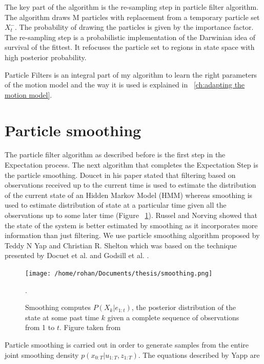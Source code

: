 \documentclass[12pt]{dalcsthesis}
\begin{document}
The key part of the algorithm is the re-sampling step in particle filter algorithm. The algorithm draws M particles with replacement from a temporary particle set $X_{t}^{-}$. The probability of drawing the particles is given by the importance factor. The re-sampling step is a probabilistic implementation of the Darwinian idea of survival of the fittest. It refocuses the particle set to regions in state space with high posterior probability. 

Particle Filters is an integral part of my algorithm to learn the right parameters of the motion model and the way it is used is explained in ~\ref{ch:adapting the motion model}.

\section{Particle smoothing}
\label{ch-: particle smoothing}
The particle filter algorithm as described before is the first step in the Expectation process. The next algorithm that completes the Expectation Step is the particle smoothing. Doucet \cite{doucet2009tutorial} in his paper stated that filtering based on observations received up to the current time is used to estimate the distribution of the current state of an Hidden Markov Model (HMM) whereas smoothing is used to estimate distribution of state at a particular time given all the observations up to some later time (Figure ~\ref{fig: particle smoothing}). Russel and Norving \cite{russell2003artificial} showed that the state of the system is better estimated by smoothing as it incorporates more information than just filtering. We use particle smoothing algorithm proposed by Teddy N Yap and Christian R. Shelton \cite{Yap2008} which was based on the technique presented by Docuet et al. \cite{doucet2000monte} and Godsill et al. \cite{Godsill2004}.
\begin{figure}
\centering
{\texttt{[image: /home/rohan/Documents/thesis/smoothing.png]}}

\caption{\label{fig: particle smoothing} Smoothing computes $P(X_{k}|e_{1:t})$, the posterior distribution of the state at some past time $k$ given a complete sequence of observations from 1 to $t$. Figure taken from \cite{russell2003artificial}}.
\end{figure}

Particle smoothing is carried out in order to generate samples from the entire joint smoothing density $p(x_{0:T}|u_{1:T},z_{1:T})$. 
The equations described by Yapp \cite{Yap2008} are
\end{document}
